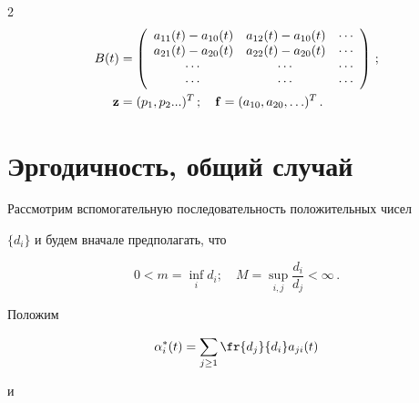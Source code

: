 \begin{multicols}{2}
\begin{align*}
B(t)&=\left(


\begin{array}{cccc}


a_{11}(t) - a_{10}(t) & a_{12}(t) - a_{10}(t)& \cdots \\


 a_{21}(t) - a_{20}(t) & a_{22}(t) - a_{20}(t) & \cdots


\\ \cdots & \cdots & \cdots


\\ \cdots & \cdots & \cdots


 \end{array}


\right)\,;\\




{\bf z}&=(p_{1},p_{2}...)^{T}\,; \quad {\bf


f}=(a_{10},a_{20},\ldots )^{T}\,.


\end{align*}





\section{Эргодичность, общий случай}





Рассмотрим вспомогательную последовательность положительных чисел


 $\{d_i\}$ и будем вначале предполагать,  что


\begin{equation}


0 < m = \inf_i d_i; \quad M=\sup_{i,j}\frac{d_i}{d_j} < \infty\,.


\label{0800}


\end{equation}





Положим


\begin{equation*}


\alpha_i^*(t)=\sum_{j \ge 1}


\fr{d_j}{d_i}a_{ji} (t) %


\end{equation*}


и



\end{multicols}

